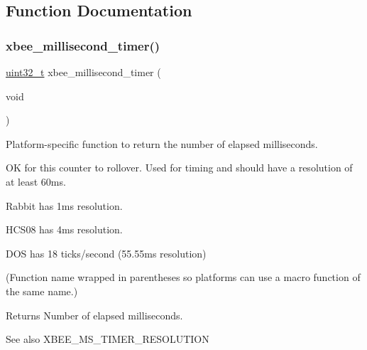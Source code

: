 \subsection{Function Documentation}
\mbox{\label{group__hal__posix_ga63bb246b86f72e88fa8ddc7a429c0e67}} 
\subsubsection{\texorpdfstring{xbee\+\_\+millisecond\+\_\+timer()}{xbee\_millisecond\_timer()}}
{\footnotesize\ttfamily \hyperlink{group__hal__dos_ga09a1e304d66d35dd47daffee9731edaa}{uint32\+\_\+t} xbee\+\_\+millisecond\+\_\+timer (\begin{DoxyParamCaption}\item[{void}]{ }\end{DoxyParamCaption})}



Platform-\/specific function to return the number of elapsed milliseconds. 

OK for this counter to rollover. Used for timing and should have a resolution of at least 60ms.


\begin{DoxyItemize}
\item Rabbit has 1ms resolution.
\item H\+C\+S08 has 4ms resolution.
\item D\+OS has 18 ticks/second (55.\+55ms resolution)
\end{DoxyItemize}

(Function name wrapped in parentheses so platforms can use a macro function of the same name.)

\begin{DoxyReturn}{Returns}
Number of elapsed milliseconds.
\end{DoxyReturn}
\begin{DoxySeeAlso}{See also}
X\+B\+E\+E\+\_\+\+M\+S\+\_\+\+T\+I\+M\+E\+R\+\_\+\+R\+E\+S\+O\+L\+U\+T\+I\+ON 
\end{DoxySeeAlso}
\mbox{\label{group__hal__posix_ga8c0c80b64f63d395e718172190b21fcc}} 
